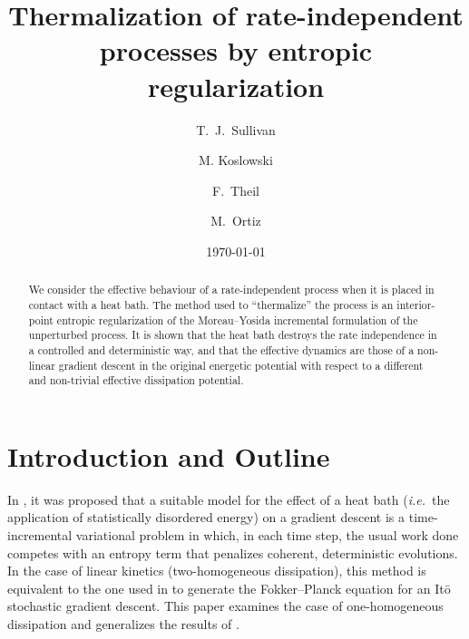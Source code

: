 \documentclass[reqno]{amsart}
\title[Thermalization of rate-independent processes]{Thermalization of rate-independent processes by entropic regularization}
\author{T.\ J.\ Sullivan}
\author{M. Koslowski}
\author{F.\ Theil}
\author{M.\ Ortiz}
\date{\today}
\theoremstyle{definition}
\begin{document}
\begin{abstract}
	We consider the effective behaviour of a rate-independent process when it is placed in contact with a heat bath.  The method used to ``thermalize'' the process is an interior-point entropic regularization of the Moreau--Yosida incremental formulation of the unperturbed process.  It is shown that the heat bath destroys the rate independence in a controlled and deterministic way, and that the effective dynamics are those of a non-linear gradient descent in the original energetic potential with respect to a different and non-trivial effective dissipation potential.
\end{abstract}

\maketitle

\section{Introduction and Outline}

In \cite{Koslowski:2003, SullivanKoslowskiTheilOrtiz:2009}, it was proposed that a suitable model for the effect of a heat bath (\emph{i.e.}\ the application of statistically disordered energy) on a gradient descent is a time-incremental variational problem in which, in each time step, the usual work done competes with an entropy term that penalizes coherent, deterministic evolutions.  In the case of linear kinetics (two-homogeneous dissipation), this method is equivalent to the one used in \cite{JordanKinderlehrerOtto:1998} to generate the Fokker--Planck equation for an It{\=o} stochastic gradient descent.  This paper examines the case of one-homogeneous dissipation and generalizes the results of \cite{SullivanKoslowskiTheilOrtiz:2009}.
\end{document}
